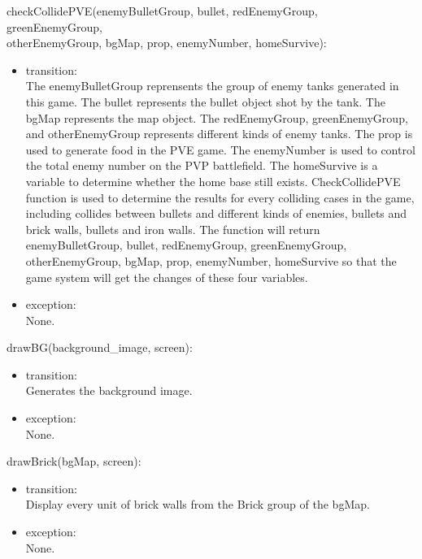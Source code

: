 \documentclass[12pt, titlepage]{article}
\begin{document}
	    checkCollidePVE(enemyBulletGroup, bullet, redEnemyGroup, greenEnemyGroup, \\otherEnemyGroup, bgMap, prop, enemyNumber, homeSurvive):
	    \begin{itemize}
	    \item transition:\\
	    The enemyBulletGroup reprensents the group of enemy tanks generated in this game. The bullet represents the bullet object shot by the tank. The bgMap represents the map object. The redEnemyGroup, greenEnemyGroup, and otherEnemyGroup represents different kinds of enemy tanks. The prop is used to generate food in the PVE game. The enemyNumber is used to control the total enemy number on the PVP battlefield. The homeSurvive is a variable to determine whether the home base still exists. CheckCollidePVE function is used to determine the results for every colliding cases in the game, including collides between bullets and different kinds of enemies, bullets and brick walls, bullets and iron walls. The function will return enemyBulletGroup, bullet, redEnemyGroup, greenEnemyGroup, otherEnemyGroup, bgMap, prop, enemyNumber, homeSurvive so that the game system will get the changes of these four variables.\\
	    
	    \item exception:\\ None.
	    \end{itemize}
	    
	    drawBG(background\_image, screen):
	    \begin{itemize}
	    \item transition:\\
	    Generates the background image.\\
	    
	    \item exception:\\ None.
	    \end{itemize}
	    
	    drawBrick(bgMap, screen):
	    \begin{itemize}
	    \item transition:\\
	    Display every unit of brick walls from the Brick group of the bgMap.\\
	    
	    \item exception:\\ None.
	    \end{itemize}
	    
\end{document}
